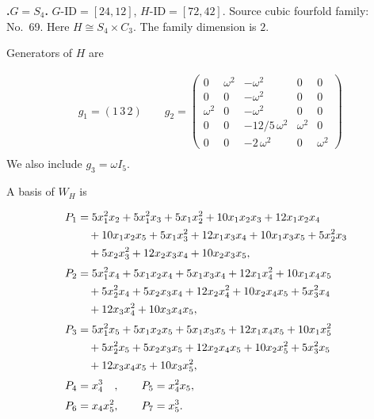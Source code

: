 \documentclass[12pt]{amsart}
\numberwithin{equation}{section}
\theoremstyle{plain}
\theoremstyle{definition}
\theoremstyle{remark}
\newenvironment{familydisplay}{%
  \begingroup
  \setlength{\arraycolsep}{1.35pt}%
  \renewcommand{\arraystretch}{0.96}%
  \setlength{\jot}{2pt}%
}{\endgroup}
\begin{document}
\par{}\medskip\noindent\textbf{.\enspace $G=S_4$.}\label{fam:threefold-no-17}
$G\text{-ID}=[24,12]$, $H\text{-ID}=[72,42]$.
Source cubic fourfold family: No.~69.  Here
$H\cong S_4\times C_3$.
The family dimension is $2$.
\par\smallskip\noindent Generators of $H$ are\par\nopagebreak
\begin{familydisplay}
\begin{align*}
&g_{1}=(1\,3\,2)\qquad g_{2}=\left(\begin{smallmatrix}0 & \omega^2 & -\omega^2 & 0 & 0 \\ 0 & 0 & -\omega^2 & 0 & 0 \\ \omega^2 & 0 & -\omega^2 & 0 & 0 \\ 0 & 0 & -12/5\,\omega^2 & \omega^2 & 0 \\ 0 & 0 & -2\,\omega^2 & 0 & \omega^2\end{smallmatrix}\right)\\
\end{align*}
\end{familydisplay}
\noindent We also include $g_{3}=\omega I_5$.
\par\smallskip\noindent A basis of $W_H$ is\par\nopagebreak
\begin{familydisplay}
\begin{alignat*}{2}
P_{1}&=5x_{1}^{2}x_{2}+5x_{1}^{2}x_{3}+5x_{1}x_{2}^{2}+10x_{1}x_{2}x_{3}+12x_{1}x_{2}x_{4}\\
&\quad +10x_{1}x_{2}x_{5}+5x_{1}x_{3}^{2}+12x_{1}x_{3}x_{4}+10x_{1}x_{3}x_{5}+5x_{2}^{2}x_{3}\\
&\quad +5x_{2}x_{3}^{2}+12x_{2}x_{3}x_{4}+10x_{2}x_{3}x_{5},\\[2pt]
P_{2}&=5x_{1}^{2}x_{4}+5x_{1}x_{2}x_{4}+5x_{1}x_{3}x_{4}+12x_{1}x_{4}^{2}+10x_{1}x_{4}x_{5}\\
&\quad +5x_{2}^{2}x_{4}+5x_{2}x_{3}x_{4}+12x_{2}x_{4}^{2}+10x_{2}x_{4}x_{5}+5x_{3}^{2}x_{4}\\
&\quad +12x_{3}x_{4}^{2}+10x_{3}x_{4}x_{5},\\[2pt]
P_{3}&=5x_{1}^{2}x_{5}+5x_{1}x_{2}x_{5}+5x_{1}x_{3}x_{5}+12x_{1}x_{4}x_{5}+10x_{1}x_{5}^{2}\\
&\quad +5x_{2}^{2}x_{5}+5x_{2}x_{3}x_{5}+12x_{2}x_{4}x_{5}+10x_{2}x_{5}^{2}+5x_{3}^{2}x_{5}\\
&\quad +12x_{3}x_{4}x_{5}+10x_{3}x_{5}^{2},\\[2pt]
P_{4}&=\mathmakebox[\widthof{$x_{4}x_{5}^{2}$}][l]{x_{4}^{3}},\qquad P_{5}=x_{4}^{2}x_{5},\\[2pt]
P_{6}&=x_{4}x_{5}^{2},\qquad P_{7}=x_{5}^{3}.\\[2pt]
\end{alignat*}
\end{familydisplay}
\end{document}
